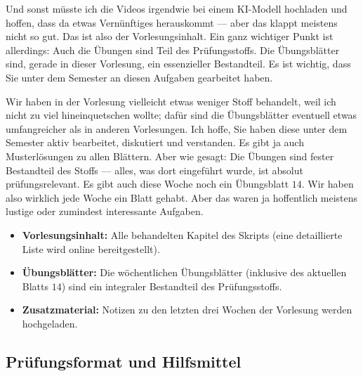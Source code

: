 \begin{spoken-clean}[01:18:37 - 01:20:27]
Und sonst müsste ich die Videos irgendwie bei einem KI-Modell hochladen und hoffen, dass da etwas Vernünftiges herauskommt --- aber das klappt meistens nicht so gut. Das ist also der Vorlesungsinhalt. Ein ganz wichtiger Punkt ist allerdings: Auch die Übungen sind Teil des Prüfungsstoffs. Die Übungsblätter sind, gerade in dieser Vorlesung, ein essenzieller Bestandteil. Es ist wichtig, dass Sie unter dem Semester an diesen Aufgaben gearbeitet haben.

Wir haben in der Vorlesung vielleicht etwas weniger Stoff behandelt, weil ich nicht zu viel hineinquetschen wollte; dafür sind die Übungsblätter eventuell etwas umfangreicher als in anderen Vorlesungen. Ich hoffe, Sie haben diese unter dem Semester aktiv bearbeitet, diskutiert und verstanden. Es gibt ja auch Musterlösungen zu allen Blättern. Aber wie gesagt: Die Übungen sind fester Bestandteil des Stoffs --- alles, was dort eingeführt wurde, ist absolut prüfungsrelevant. Es gibt auch diese Woche noch ein Übungsblatt $14$. Wir haben also wirklich jede Woche ein Blatt gehabt. Aber das waren ja hoffentlich meistens lustige oder zumindest interessante Aufgaben.
\end{spoken-clean}

\begin{nice-box}
\begin{itemize}
    \item \textbf{Vorlesungsinhalt:} Alle behandelten Kapitel des Skripts (eine detaillierte Liste wird online bereitgestellt).
    \item \textbf{Übungsblätter:} Die wöchentlichen Übungsblätter (inklusive des aktuellen Blatts $14$) sind ein integraler Bestandteil des Prüfungsstoffs.
    \item \textbf{Zusatzmaterial:} Notizen zu den letzten drei Wochen der Vorlesung werden hochgeladen.
\end{itemize}
\end{nice-box}

\subsection{Prüfungsformat und Hilfsmittel}

